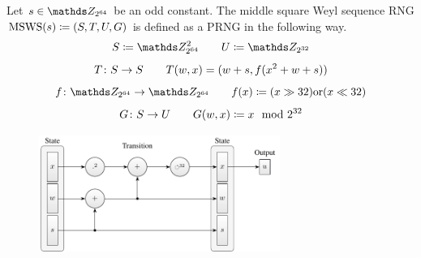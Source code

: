 \documentclass{stdlocal}
\begin{document}
    \begin{definition}
      Let $s\in\setInteger_{2^{64}}$ be an odd constant.
      The middle square Weyl sequence RNG $\mathrm{MSWS}(s)\coloneqq(S,T,U,G)$ is defined as a PRNG in the following way.
      \[
        S \define \setInteger_{2^{64}}^2
        \separate
        U \define \setInteger_{2^{32}}
      \]
      \[
        T\colon S\to S
        \qquad
        T(w,x) = (w+s, f(x^2 + w + s))
      \]
      \[
        \function{f}{\setInteger_{2^{64}}}{\setInteger_{2^{64}}}
        \separate
        f(x) \define (x \gg 32) \mathrm{or} (x \ll 32)
      \]
      \[
        G\colon S\to U
        \qquad
        G(w,x) \coloneqq x \mod 2^{32}
      \]
    \end{definition}

    \begin{figure}
      \center
      \includegraphics[width=0.7\textwidth]{figures/msws_scheme.pdf}
      \caption[Middle Square Weyl Sequence RNG Scheme]{}
      \label{fig:msws-scheme}
    \end{figure}
\end{document}
